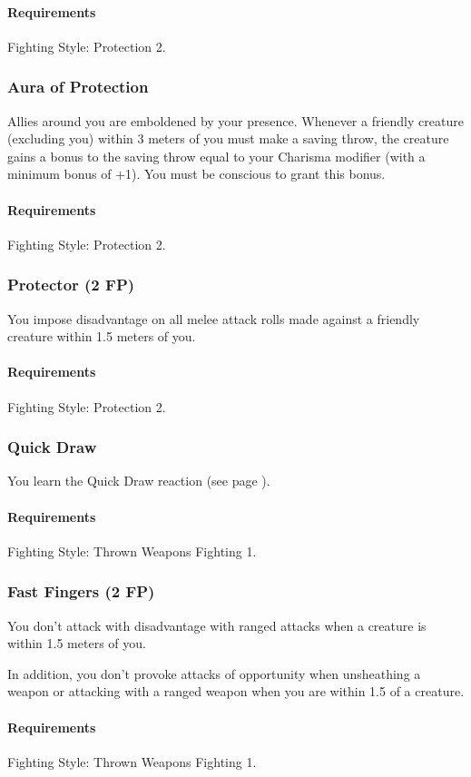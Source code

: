     \paragraph{Requirements} Fighting Style: Protection 2.
\subsubsection{Aura of Protection} \label{feat::auraofprotection}
    Allies around you are emboldened by your presence.
    Whenever a friendly creature (excluding you) within 3 meters of you must make a saving throw, the creature gains a bonus to the saving throw equal to your Charisma modifier (with a minimum bonus of +1).
    You must be conscious to grant this bonus.
    \paragraph{Requirements} Fighting Style: Protection 2.
\subsubsection{Protector (2 FP)} \label{feat::protector}
    You impose disadvantage on all melee attack rolls made against a friendly creature within 1.5 meters of you.
    \paragraph{Requirements} Fighting Style: Protection 2.
\subsubsection{Quick Draw} \label{feat::quickdraw}
    You learn the Quick Draw reaction (see page \pageref{act::quickdraw}).
    \paragraph{Requirements} Fighting Style: Thrown Weapons Fighting 1.
\subsubsection{Fast Fingers (2 FP)} \label{feat::fastfingers}
    You don't attack with disadvantage with ranged attacks when a creature is within 1.5 meters of you.

    In addition, you don't provoke attacks of opportunity when unsheathing a weapon or attacking with a ranged weapon when you are within 1.5 of a creature.
    \paragraph{Requirements} Fighting Style: Thrown Weapons Fighting 1.
